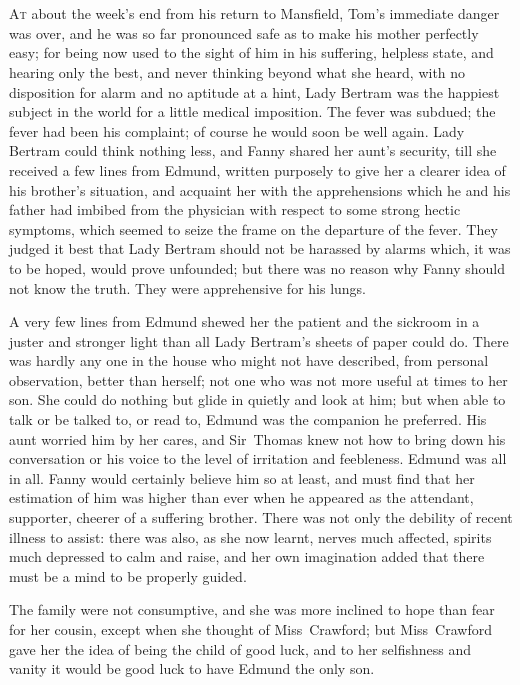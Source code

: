 \chapter[Chapter \thechapter]{} 

 \lettrine[lraise=0.3]{A}{t} about the week's end from his return to Mansfield, Tom's immediate danger was over, and he was so far pronounced safe as to make his mother perfectly easy; for being now used to the sight of him in his suffering, helpless state, and hearing only the best, and never thinking beyond what she heard, with no disposition for alarm and no aptitude at a hint, Lady Bertram was the happiest subject in the world for a little medical imposition. The fever was subdued; the fever had been his complaint; of course he would soon be well again. Lady Bertram could think nothing less, and Fanny shared her aunt's security, till she received a few lines from Edmund, written purposely to give her a clearer idea of his brother's situation, and acquaint her with the apprehensions which he and his father had imbibed from the physician with respect to some strong hectic symptoms, which seemed to seize the frame on the departure of the fever. They judged it best that Lady Bertram should not be harassed by alarms which, it was to be hoped, would prove unfounded; but there was no reason why Fanny should not know the truth. They were apprehensive for his lungs.

A very few lines from Edmund shewed her the patient and the sickroom in a juster and stronger light than all Lady Bertram's sheets of paper could do. There was hardly any one in the house who might not have described, from personal observation, better than herself; not one who was not more useful at times to her son. She could do nothing but glide in quietly and look at him; but when able to talk or be talked to, or read to, Edmund was the companion he preferred. His aunt worried him by her cares, and Sir~Thomas knew not how to bring down his conversation or his voice to the level of irritation and feebleness. Edmund was all in all. Fanny would certainly believe him so at least, and must find that her estimation of him was higher than ever when he appeared as the attendant, supporter, cheerer of a suffering brother. There was not only the debility of recent illness to assist: there was also, as she now learnt, nerves much affected, spirits much depressed to calm and raise, and her own imagination added that there must be a mind to be properly guided.

The family were not consumptive, and she was more inclined to hope than fear for her cousin, except when she thought of Miss~Crawford; but Miss~Crawford gave her the idea of being the child of good luck, and to her selfishness and vanity it would be good luck to have Edmund the only son.

